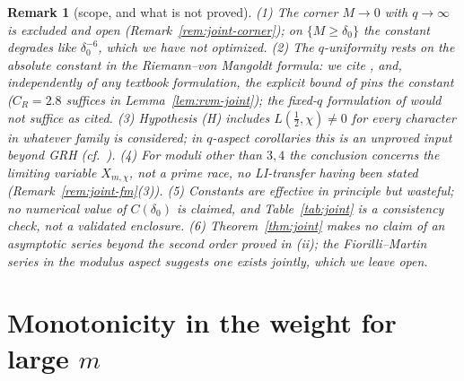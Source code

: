 \documentclass[11pt]{article}
\newtheorem{remark}{Remark}
\begin{document}
\begin{remark}[scope, and what is not proved]\label{rem:joint-scope}
(1) The corner $M\to0$ with $q\to\infty$ is excluded and open
(Remark~\ref{rem:joint-corner}); on $\{M\ge\delta_0\}$ the constant
degrades like $\delta_0^{-6}$, which we have not optimized. (2) The
$q$-uniformity rests on the absolute constant in the Riemann--von
Mangoldt formula: we cite \cite[Theorem~14.5]{MV07}, and,
independently of any textbook formulation, the explicit bound of
\cite[Corollary~1.2]{BMOR21} pins the constant ($C_R=2.8$ suffices in
Lemma~\ref{lem:rvm-joint}); the fixed-$q$ formulation of
\cite[\S16]{Dav00} would not suffice as cited. (3) Hypothesis (H)
includes $L(\tfrac12,\chi)\ne0$ for every
character in whatever family is considered; in $q$-aspect corollaries
this is an unproved input beyond GRH (cf.\ \cite{Sou00}). (4) For
moduli other than $3,4$ the conclusion concerns the limiting variable
$X_{m,\chi}$, not a prime race, no LI-transfer having been stated
(Remark~\ref{rem:joint-fm}(3)). (5) Constants are effective in
principle but wasteful; no numerical value of $C(\delta_0)$ is
claimed, and Table~\ref{tab:joint} is a consistency check, not a
validated enclosure. (6) Theorem~\ref{thm:joint} makes no claim of an
asymptotic \emph{series} beyond the second order proved in (ii); the
Fiorilli--Martin series in the modulus aspect suggests one exists
jointly, which we leave open.
\end{remark}


\section{Monotonicity in the weight for large $m$}
\label{sec:monotone-large}
\end{document}

